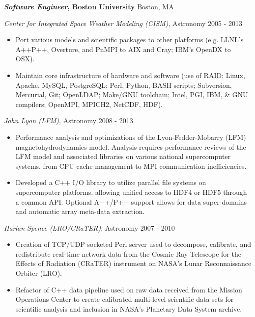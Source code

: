\documentclass[line,margin]{res}
\begin{document}
\begin{resume}
          {\bf \emph{Software Engineer}, Boston University} \hfill Boston, MA

          {\sl Center for Integrated Space Weather Modeling (CISM)}, Astronomy \hfill 2005 - 2013
          \begin{itemize} \itemsep -2pt %
          \item
            Port various models and scientific packages to other platforms (e.g. LLNL's A++P++, Overture, and PnMPI to AIX and Cray; IBM's OpenDX to OSX).
          \item
            Maintain core infrastructure of hardware and software (use of RAID; Linux, Apache, MySQL, PostgreSQL; Perl, Python, BASH scripts; Subversion, Mercurial, Git; OpenLDAP; Make/GNU toolchain; Intel, PGI, IBM, \& GNU compilers; OpenMPI, MPICH2, NetCDF, HDF).
          \end{itemize}

          {\sl John Lyon (LFM)}, Astronomy \hfill 2008 - 2013
          \begin{itemize} \itemsep -2pt %
          \item
            Performance analysis and optimizations of the Lyon-Fedder-Mobarry (LFM) magnetohydrodynamics model.  Analysis requires performance reviews of the LFM model and associated libraries on various national supercomputer systems, from CPU cache management to MPI communication inefficiencies.
          \item
            Developed a C++ I/O library to utilize parallel file systems on supercomputer platforms, allowing unified access to HDF4 or HDF5 through a common API. Optional A++/P++ support allows for data super-domains and automatic array meta-data extraction.
          \end{itemize}

          {\sl Harlan Spence (LRO/CRaTER)}, Astronomy \hfill 2007 - 2010
          \begin{itemize} \itemsep -2pt
          \item
            Creation of TCP/UDP socketed Perl server used to decompose, calibrate, and redistribute real-time network data from the Cosmic Ray Telescope for the Effects of Radiation (CRaTER) instrument on NASA's Lunar Reconnaissance Orbiter (LRO).
          \item
            Refactor of C++ data pipeline used on raw data received from the Mission Operations Center to create calibrated multi-level scientific data sets for scientific analysis and inclusion in NASA's Planetary Data System archive.
          \end{itemize}


\end{resume}
\end{document}
